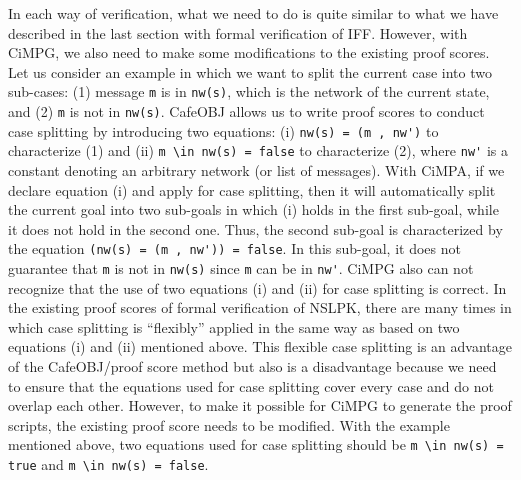 \documentclass[10pt, conference, compsocconf]{IEEEtran}
\begin{document}
	In each way of verification, what we need to do is quite similar to what we have described in the last section with formal verification of IFF. 
	However, with CiMPG, we also need to make some modifications to the existing proof scores. 
	Let us consider an example in which we want to split the current case into two sub-cases: (1) message \verb!m! is in \verb!nw(s)!, which is the network of the current state, and (2) \verb!m! is not in \verb!nw(s)!.
	CafeOBJ allows us to write proof scores to conduct case splitting by introducing two equations: (i) \verb!nw(s) = (m , nw')! to characterize (1) and (ii) \verb!m \in nw(s) = false! to characterize (2), where \verb!nw'! is a constant denoting an arbitrary network (or list of messages).
	With CiMPA, if we declare equation (i) and apply for case splitting, then it will automatically split the current goal into two sub-goals in which (i) holds in the first sub-goal, while it does not hold in the second one. Thus, the second sub-goal is characterized by the equation \verb!(nw(s) = (m , nw')) = false!. 
	In this sub-goal, it does not guarantee that \verb!m! is not in \verb!nw(s)! since \verb!m! can be in \verb!nw'!.
	CiMPG also can not recognize that the use of two equations (i) and (ii) for case splitting is correct.
	In the existing proof scores of formal verification of NSLPK, there are many times in which case splitting is ``flexibly'' applied in the same way as based on two equations (i) and (ii) mentioned above.
	This flexible case splitting is an advantage of the CafeOBJ/proof score method but also is a disadvantage because we need to ensure that the equations used for case splitting cover every case and do not overlap each other.
	However, to make it possible for CiMPG to generate the proof scripts, the existing proof score needs to be modified.
	With the example mentioned above, two equations used for case splitting should be \verb!m \in nw(s) = true! and \verb!m \in nw(s) = false!.
	
	
	
\end{document}
